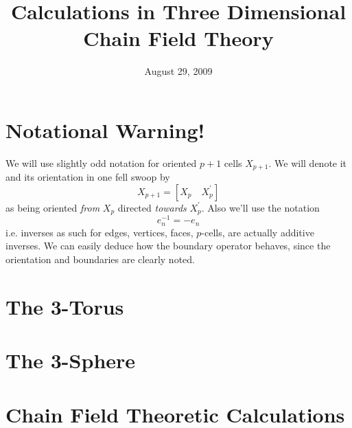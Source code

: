 \documentclass[10pt,oneside]{article}
\title{Calculations in Three Dimensional Chain Field Theory}
\date{August 29, 2009}
\begin{document}
\maketitle

\section{Notational Warning!}

We will use slightly odd notation for oriented $p+1$ cells
$X_{p+1}$. We will denote it and its orientation in one fell
swoop by
\begin{equation}%
X_{p+1} = [X_{p} \quad X^{\prime}_{p}]
\end{equation}
as being oriented \emph{from} $X_{p}$ directed \emph{towards} $X^{\prime}_{p}$.
Also we'll use the notation
\begin{equation}%
e^{-1}_{n}=-e_{n}
\end{equation}
i.e. inverses as such for edges, vertices, faces, $p$-cells, are
actually additive inverses. We can easily deduce how the boundary
operator behaves, since the orientation and boundaries are clearly noted.

\section{The 3-Torus}

\section{The 3-Sphere}


\section{Chain Field Theoretic Calculations}


\nocite{*}


\end{document}
